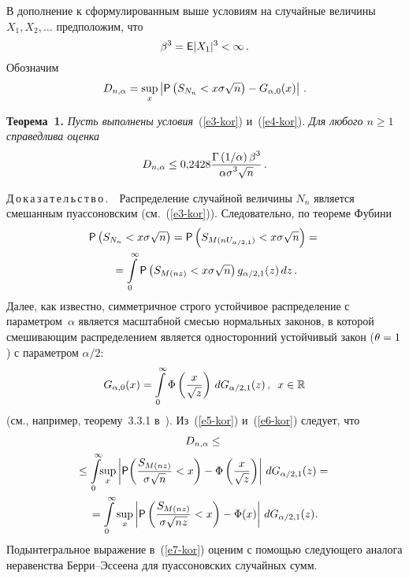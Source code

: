 \begin{multicols}{2}
В дополнение к сформулированным выше условиям на случайные величины
$X_1,X_2,\ldots$ предположим, что
\begin{equation}
\beta^3={\sf E}|X_1|^3<\infty\,.\label{e4-kor}
\end{equation}
Обозначим
$$
D_{n,\alpha}=\sup_x\left\vert {\sf
P}\left(S_{N_n}<x\sigma\sqrt{n}\right)-G_{\alpha,0}(x)\right\vert\,.
$$


\smallskip

\noindent
\textbf{Теорема~1.} \textit{Пусть выполнены условия}~(\ref{e3-kor}) и~(\ref{e4-kor}). \textit{Для
любого $n\ge1$ справедлива оценка}
$$
D_{n,\alpha}\le0{,}2428
\displaystyle\frac{\displaystyle \Gamma\left({1}/{\alpha}\right)\beta^3\mathstrut}{\displaystyle \alpha\sigma^3\sqrt{n}\mathstrut}\,.
$$

\smallskip

\noindent
Д\,о\,к\,а\,з\,а\,т\,е\,л\,ь\,с\,т\,в\,о\,.\ \  Распределение случайной величины $N_n$
является смешанным пуассоновским (см.~(\ref{e3-kor})). Следовательно, по теореме
Фубини
\begin{multline}
{\sf P}\left(S_{N_n}<x\sigma\sqrt{n}\right)=
{\sf P}\left(S_{M(nU_{\alpha/2,1})}<x\sigma\sqrt{n}\right)={}\\
{}=\int\limits_0^{\infty}{\sf P}\left(S_{M(nz)}<x\sigma\sqrt{n}\right)
g_{\alpha/2,1}(z)\,dz\,.\label{e5-kor}
\end{multline}
Далее, как известно, симметричное строго устойчивое распределение с
параметром~$\alpha$ является масштабной смесью нормальных законов, в
которой смешивающим распределением является односторонний устойчивый
закон ($\theta\hm=1$) с параметром $\alpha/2$:
\begin{equation}
G_{\alpha,0}(x)=\int\limits_{0}^{\infty}\Phi\left(\displaystyle\frac{\displaystyle x\mathstrut}{\displaystyle \sqrt{z}\mathstrut}\right)\,dG_{\alpha/2,1}(z)\,,\enskip
x\in\mathbb{R}\label{e6-kor}
\end{equation}
(см., например, теорему~3.3.1 в~\cite{Zolotarev1983}). Из~(\ref{e5-kor}) и~(\ref{e6-kor})
следует, что
\begin{multline}
D_{n,\alpha}\le{}\\
\!{}\le\int\limits_0^{\infty}\!\!\sup\limits_x\left\vert{\sf P}\!
\left(\fr{S_{M(nz)}}{\sigma\sqrt{n}}<x\right)-
\Phi\left(\fr{x}{\sqrt{z}}\right)\right\vert\,dG_{\alpha/2,1}(z)={}\\
\!\!\!{}= \int\limits_0^{\infty}\sup\limits_x \left\vert{\sf P}
\left(\fr{S_{M(nz)}}{\sigma\sqrt{nz}}<x\right)-\Phi(x)\right\vert\,dG_{\alpha/2,1}(z).\!\!
\label{e7-kor}
\end{multline}
Подынтегральное выражение в~(\ref{e7-kor}) оценим с по\-мощью следующего аналога
неравенства Бер\-ри--Эс\-се\-ена для пуассоновских случайных сумм.


\end{multicols}
